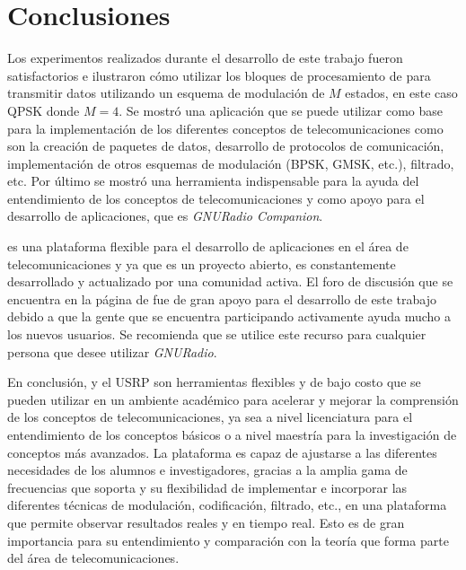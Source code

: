 \chapter{Conclusiones}
Los experimentos realizados durante el desarrollo de este trabajo fueron satisfactorios e ilustraron c\'omo utilizar los bloques
de procesamiento de \gnuradio para transmitir datos utilizando un esquema de modulaci\'on de $M$ estados, en este caso QPSK donde
$M=4$. Se mostr\'o una aplicaci\'on que se puede utilizar como base para la implementaci\'on de los diferentes conceptos de
telecomunicaciones como son la creaci\'on de paquetes de datos, desarrollo de protocolos de comunicaci\'on, implementaci\'on de
otros esquemas de modulaci\'on (BPSK, GMSK, etc.), filtrado, etc. Por \'ultimo se mostr\'o una herramienta indispensable para la
ayuda del entendimiento de los conceptos de telecomunicaciones y como apoyo para el desarrollo de aplicaciones, que es
\emph{GNURadio Companion}.

\gnuradio es una plataforma flexible para el desarrollo de aplicaciones en el \'area de telecomunicaciones y ya que es
un proyecto abierto, es constantemente desarrollado y actualizado por una comunidad activa. El foro de discusi\'on que se
encuentra en la p\'agina de \gnuradio \cite{radio} fue de gran apoyo para el desarrollo de este trabajo debido a que la gente que
se encuentra participando activamente ayuda mucho a los nuevos usuarios. Se recomienda que se utilice este
recurso para cualquier persona que desee utilizar \emph{GNURadio}.


En conclusi\'on, \gnuradio y el USRP son herramientas flexibles y de bajo costo que se pueden utilizar en un ambiente acad\'emico
para acelerar y mejorar la comprensi\'on de los conceptos de telecomunicaciones, ya sea a nivel licenciatura para el entendimiento
de los conceptos b\'asicos o a nivel maestr\'ia para la investigaci\'on de conceptos m\'as avanzados. La plataforma es capaz de
ajustarse a las diferentes necesidades de los alumnos e investigadores, gracias a la amplia gama de frecuencias que soporta y su
flexibilidad de implementar e incorporar las diferentes t\'ecnicas de modulaci\'on, codificaci\'on, filtrado, etc., en una
plataforma que permite observar resultados reales y en tiempo real. Esto es de gran importancia para su entendimiento y
comparaci\'on con la teor\'ia que forma parte del \'area de telecomunicaciones.


